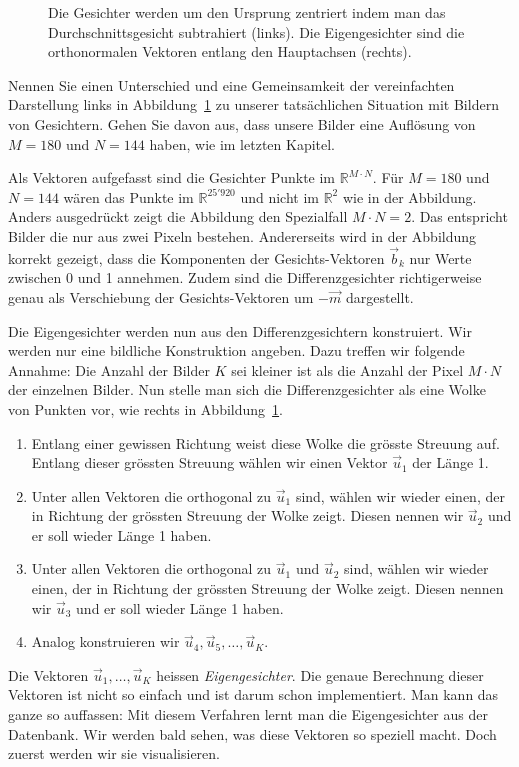 \begin{figure}[ht]
\begin{minipage}{0.5\textwidth}
	\end{minipage}
	\caption{Die Gesichter werden um den Ursprung zentriert indem man das Durchschnittsgesicht subtrahiert (links).
	Die Eigengesichter sind die orthonormalen Vektoren entlang den Hauptachsen (rechts).}
	\label{fig:meandiff}
\end{figure}
\begin{aufgabe} \label{aufg:hmmc}
	Nennen Sie einen Unterschied und eine Gemeinsamkeit der vereinfachten Darstellung links in Abbildung~\ref{fig:meandiff} zu unserer tatsächlichen Situation mit Bildern von Gesichtern.
	Gehen Sie davon aus, dass unsere Bilder eine Auflösung von $M=180$ und $N=144$ haben, wie im letzten Kapitel.
\end{aufgabe}
\begin{losung*}
	Als Vektoren aufgefasst sind die Gesichter Punkte im $\mathbb R^{M\cdot N}$.
	Für $M=180$ und $N=144$ wären das Punkte im $\mathbb R^{25'920}$ und nicht im $\mathbb R^2$ wie in der Abbildung.
	Anders ausgedrückt zeigt die Abbildung den Spezialfall $M\cdot N=2$.
	Das entspricht Bilder die nur aus zwei Pixeln bestehen.
	Andererseits wird in der Abbildung korrekt gezeigt, dass die Komponenten der Gesichts-Vektoren $\vec b_k$ nur Werte zwischen 0 und 1 annehmen.
	Zudem sind die Differenzgesichter richtigerweise genau als Verschiebung der Gesichts-Vektoren um $-\vec m$ dargestellt.
\end{losung*}

Die Eigengesichter werden nun aus den Differenzgesichtern konstruiert.
Wir werden nur eine bildliche Konstruktion angeben.
Dazu treffen wir folgende Annahme: Die Anzahl der Bilder $K$ sei kleiner ist als die Anzahl der Pixel $M\cdot N$ der einzelnen Bilder.
Nun stelle man sich die Differenzgesichter als eine \glqq{}Wolke\grqq{} von Punkten vor, wie rechts in Abbildung~\ref{fig:meandiff}.
\begin{enumerate}[leftmargin=3cm, label=Schritt \arabic*:]
	\item Entlang einer gewissen Richtung weist diese Wolke die grösste Streuung auf.
	Entlang dieser grössten Streuung wählen wir einen Vektor $\vec u_1$ der Länge 1.
	\item Unter allen Vektoren die orthogonal zu $\vec u_1$ sind, wählen wir wieder einen, der in Richtung der grössten Streuung der Wolke zeigt.
	Diesen nennen wir $\vec u_2$ und er soll wieder Länge 1 haben.
	\item Unter allen Vektoren die orthogonal zu $\vec u_1$ und $\vec u_2$ sind, wählen wir wieder einen, der in Richtung der grössten Streuung der Wolke zeigt.
	Diesen nennen wir $\vec u_3$ und er soll wieder Länge 1 haben.
	\item Analog konstruieren wir $\vec u_4,\vec u_5,\ldots,\vec u_K$.
\end{enumerate}
Die Vektoren $\vec u_1,\ldots,\vec u_K$ heissen \textit{Eigengesichter}.
Die genaue Berechnung dieser Vektoren ist nicht so einfach und ist darum schon implementiert.
Man kann das ganze so auffassen: Mit diesem Verfahren \glqq{}lernt\grqq{} man die Eigengesichter aus der Datenbank.
Wir werden bald sehen, was diese Vektoren so speziell macht.
Doch zuerst werden wir sie visualisieren.

